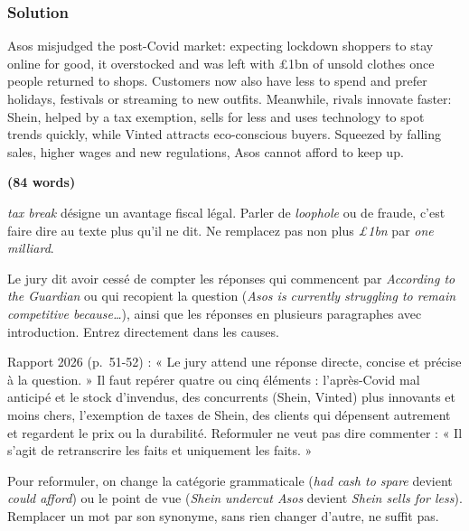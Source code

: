 \documentclass[11pt,a4paper]{article}
\begin{document}
\hypertarget{solution-3}{%
\subsubsection{Solution}\label{solution-3}}

Asos misjudged the post-Covid market: expecting lockdown shoppers to stay online for good, it overstocked and was left with £1bn of unsold clothes once people returned to shops. Customers now also have less to spend and prefer holidays, festivals or streaming to new outfits. Meanwhile, rivals innovate faster: Shein, helped by a tax exemption, sells for less and uses technology to spot trends quickly, while Vinted attracts eco-conscious buyers. Squeezed by falling sales, higher wages and new regulations, Asos cannot afford to keep up.

\textbf{(84 words)}

\begin{piege}

\emph{tax break} désigne un avantage fiscal légal. Parler de \emph{loophole} ou de fraude, c'est faire dire au texte plus qu'il ne dit. Ne remplacez pas non plus \emph{£1bn} par \emph{one milliard}.

\end{piege}

\begin{piege}

Le jury dit avoir cessé de compter les réponses qui commencent par \emph{According to the Guardian} ou qui recopient la question (\emph{Asos is currently struggling to remain competitive because\ldots{}}), ainsi que les réponses en plusieurs paragraphes avec introduction. Entrez directement dans les causes.

\end{piege}

\begin{jury}

Rapport 2026 (p.~51-52) : « Le jury attend une réponse directe, concise et précise à la question. » Il faut repérer quatre ou cinq éléments : l'après-Covid mal anticipé et le stock d'invendus, des concurrents (Shein, Vinted) plus innovants et moins chers, l'exemption de taxes de Shein, des clients qui dépensent autrement et regardent le prix ou la durabilité. Reformuler ne veut pas dire commenter : « Il s'agit de retranscrire les faits et uniquement les faits. »

\end{jury}

\begin{methode}

Pour reformuler, on change la catégorie grammaticale (\emph{had cash to spare} devient \emph{could afford}) ou le point de vue (\emph{Shein undercut Asos} devient \emph{Shein sells for less}). Remplacer un mot par son synonyme, sans rien changer d'autre, ne suffit pas.

\end{methode}
\end{document}

